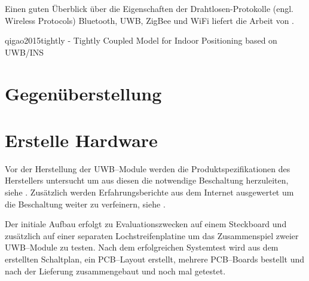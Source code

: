 \begin{comment}
Welche alternativen Technologien gibt es zu UWB?
\end{comment}

Einen guten Überblick über die Eigenschaften der Drahtlosen-Protokolle (engl. Wireless Protocols) Bluetooth, UWB, ZigBee und WiFi liefert die Arbeit \cite{lee2007comparative} von \citeauthor{lee2007comparative}.

qigao2015tightly - Tightly Coupled Model for Indoor Positioning based on UWB/INS


\begin{comment}
------------------------------------------------------------------------------------------
\end{comment}
\section{Gegenüberstellung}

\begin{comment}
Welche Eigenschaften haben die alternativen Technologien?
Warum hab ich mich für UWB entschieden?
\end{comment}


\begin{comment}
------------------------------------------------------------------------------------------
\end{comment}
\section{Erstelle Hardware}

Vor der Herstellung der UWB--Module werden die Produktspezifikationen des Herstellers untersucht um aus diesen die notwendige Beschaltung herzuleiten, siehe \cite{decawave2016dwm1kdatasheet, decawave2013power}. Zusätzlich werden Erfahrungsberichte aus dem Internet ausgewertet um die Beschaltung weiter zu verfeinern, siehe \cite{Trojer2015, Holder2016, Holder2016a}.

Der initiale Aufbau erfolgt zu Evaluationszwecken auf einem Steckboard und zusätzlich auf einer separaten Lochstreifenplatine um das Zusammenspiel zweier UWB--Module zu testen. Nach dem erfolgreichen Systemtest wird aus dem erstellten Schaltplan, ein PCB--Layout erstellt, mehrere PCB--Boards bestellt und nach der Lieferung zusammengebaut und noch mal getestet.


\begin{comment}
------------------------------------------------------------------------------------------
\end{comment}
